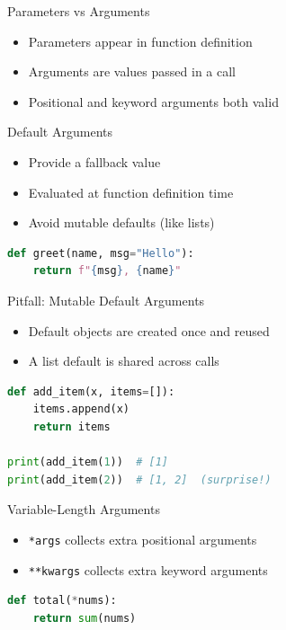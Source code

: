 \documentclass{beamer}
\begin{document}
\begin{frame}[fragile]{Parameters vs Arguments}
  \begin{itemize}[<+->]
    \item Parameters appear in function definition
    \item Arguments are values passed in a call
    \item Positional and keyword arguments both valid
  \end{itemize}
\end{frame}

\begin{frame}[fragile]{Default Arguments}
  \begin{itemize}[<+->]
    \item Provide a fallback value
    \item Evaluated at function definition time
    \item Avoid mutable defaults (like lists)
  \end{itemize}
  \vspace{0.4em}
  \begin{lstlisting}[language=Python]
def greet(name, msg="Hello"):
    return f"{msg}, {name}"
  \end{lstlisting}
\end{frame}

\begin{frame}[fragile]{Pitfall: Mutable Default Arguments}
  \begin{itemize}[<+->]
    \item Default objects are created once and reused
    \item A list default is shared across calls
  \end{itemize}
  \vspace{0.4em}
  \begin{lstlisting}[language=Python]
def add_item(x, items=[]):
    items.append(x)
    return items

print(add_item(1))  # [1]
print(add_item(2))  # [1, 2]  (surprise!)
  \end{lstlisting}
\end{frame}

\begin{frame}[fragile]{Variable-Length Arguments}
  \begin{itemize}[<+->]
    \item \texttt{*args} collects extra positional arguments
    \item \texttt{**kwargs} collects extra keyword arguments
  \end{itemize}
  \vspace{0.4em}
  \begin{lstlisting}[language=Python]
def total(*nums):
    return sum(nums)
  \end{lstlisting}
\end{frame}
\end{document}
